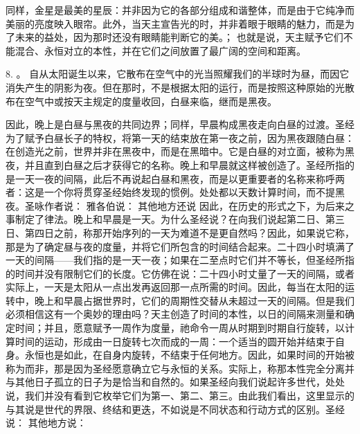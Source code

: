 同样，金星是最美的星辰：并非因为它的各部分组成和谐整体，而是由于它纯净而美丽的亮度映入眼帘。此外，当天主宣告光的时，并非着眼于眼睛的魅力，而是为了未来的益处，因为那时还没有眼睛能判断它的美。； 也就是说，天主赋予它们不能混合、永恒对立的本性，并在它们之间放置了最广阔的空间和距离。\par

8. 。 自从太阳诞生以来，它散布在空气中的光当照耀我们的半球时为昼，而因它消失产生的阴影为夜。但在那时，不是根据太阳的运行，而是按照这种原始的光散布在空气中或按天主规定的度量收回，白昼来临，继而是黑夜。\par

 因此，晚上是白昼与黑夜的共同边界；同样，早晨构成黑夜走向白昼的过渡。圣经为了赋予白昼长子的特权，将第一天的结束放在第一夜之前，因为黑夜跟随白昼：在创造光之前，世界并非在黑夜中，而是在黑暗中。它是白昼的对立面，被称为黑夜，并且直到白昼之后才获得它的名称。晚上和早晨就这样被创造了。圣经所指的是一天一夜的间隔，此后不再说起白昼和黑夜，而是以更重要者的名称来称呼两者：这是一个你将贯穿圣经始终发现的惯例。处处都以天数计算时间，而不提黑夜。圣咏作者说： 雅各伯说： 其他地方还说 因此，在历史的形式之下，为后来之事制定了律法。晚上和早晨是一天。为什么圣经说？在向我们说起第二日、第三日、第四日之前，称那开始序列的一天为难道不是更自然吗？因此，如果说它称，那是为了确定昼与夜的度量，并将它们所包含的时间结合起来。二十四小时填满了一天的间隔——我们指的是一天一夜；如果在二至点时它们并不等长，但圣经所指的时间并没有限制它们的长度。它仿佛在说：二十四小时丈量了一天的间隔，或者实际上，一天是太阳从一点出发再返回那一点所需的时间。因此，每当在太阳的运转中，晚上和早晨占据世界时，它们的周期性交替从未超过一天的间隔。但是我们必须相信这有一个奥妙的理由吗？天主创造了时间的本性，以日的间隔来测量和确定时间；并且，愿意赋予一周作为度量，祂命令一周从时期到时期自行旋转，以计算时间的运动，形成由一日旋转七次而成的一周：一个适当的圆开始并结束于自身。永恒也是如此，在自身内旋转，不结束于任何地方。因此，如果时间的开始被称为而非，那是因为圣经愿意确立它与永恒的关系。实际上，称那本性完全分离并与其他日子孤立的日子为是恰当和自然的。如果圣经向我们说起许多世代，处处说，我们并没有看到它枚举它们为第一、第二、第三。由此我们看出，这里显示的与其说是世代的界限、终结和更迭，不如说是不同状态和行动方式的区别。圣经说： 其他地方说： 